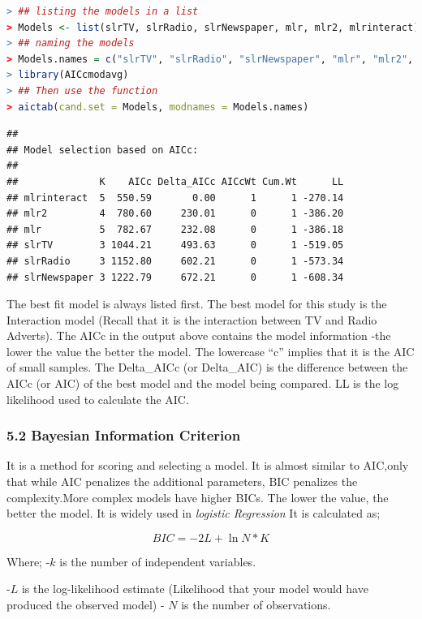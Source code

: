 \documentclass[
]{article}
\begin{document}
\begin{lstlisting}[language=R]
> ## listing the models in a list
> Models <- list(slrTV, slrRadio, slrNewspaper, mlr, mlr2, mlrinteract)
> ## naming the models
> Models.names = c("slrTV", "slrRadio", "slrNewspaper", "mlr", "mlr2", "mlrinteract")
> library(AICcmodavg)
> ## Then use the function
> aictab(cand.set = Models, modnames = Models.names)
\end{lstlisting}

\begin{lstlisting}
## 
## Model selection based on AICc:
## 
##              K    AICc Delta_AICc AICcWt Cum.Wt      LL
## mlrinteract  5  550.59       0.00      1      1 -270.14
## mlr2         4  780.60     230.01      0      1 -386.20
## mlr          5  782.67     232.08      0      1 -386.18
## slrTV        3 1044.21     493.63      0      1 -519.05
## slrRadio     3 1152.80     602.21      0      1 -573.34
## slrNewspaper 3 1222.79     672.21      0      1 -608.34
\end{lstlisting}

The best fit model is always listed first. The best model for this study
is the Interaction model (Recall that it is the interaction between TV
and Radio Adverts). The AICc in the output above contains the model
information -the lower the value the better the model. The lowercase
``c'' implies that it is the AIC of small samples. The Delta\_AICc (or
Delta\_AIC) is the difference between the AICc (or AIC) of the best
model and the model being compared. LL is the log likelihood used to
calculate the AIC.

\hypertarget{bayesian-information-criterion}{%
\subsubsection{5.2 Bayesian Information
Criterion}\label{bayesian-information-criterion}}

It is a method for scoring and selecting a model. It is almost similar
to AIC,only that while AIC penalizes the additional parameters, BIC
penalizes the complexity.More complex models have higher BICs. The lower
the value, the better the model. It is widely used in \emph{logistic
Regression} It is calculated as;

\[BIC=-2L+\ln{N}*K\]

Where; -\(k\) is the number of independent variables.

-\(L\) is the log-likelihood estimate (Likelihood that your model would
have produced the observed model) - \(N\) is the number of observations.
\end{document}
